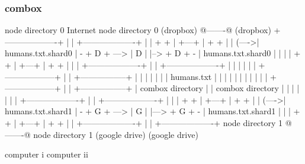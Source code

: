 \begin{frame}[fragile]
  \frametitle{combox}

  {\tiny
  \begin{semiverbatim}

         node directory 0                Internet              node directory 0
         (dropbox)                       @-------@             (dropbox)
        +-------------------+            |       |            +-------------------+
        |                   |    + +     | +---+ |     + +    |                   |
  (---->| humans.txt.shard0 | - + D + ---> | D | |--> + D + - | humans.txt.shard0 |
  |     |                   |    + +     | +---+ |     + +    |                   |
  |     +-------------------+            |       |            +-------------------+
  |                                      |       |
  |                                      |       |
 +------------------+                    |       |                        +-----------------+
 |                  |                    |       |                        |                 |
 |  humans.txt      |                    |       |                        |                 |
 |                  |                    |       |                        |                 |
 +------------------+                    |       |                        +-----------------+
  |  combox directory                    |       |                      combox directory
  |                                      |       |
  |                                      |       |
  |     +-------------------+            |       |             +-------------------+
  |     |                   |    + +     | +---+ |      + +    |                   |
  (---->| humans.txt.shard1 | - + G + ---> | G | |---> + G + - | humans.txt.shard1 |
        |                   |    + +     | +---+ |      + +    |                   |
        +-------------------+            |       |             +-------------------+
         node directory 1                @-------@              node directory 1
         (google drive)                                         (google drive)

  computer i                                                                    computer ii
  \end{semiverbatim}
  }

\end{frame}



